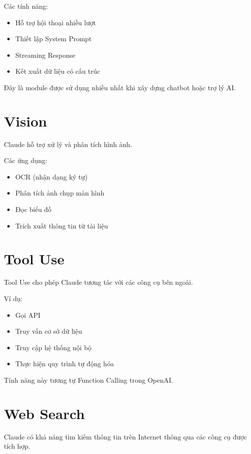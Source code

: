 \documentclass[12pt]{article}
\begin{document}
Các tính năng:

\begin{itemize}
    \item Hỗ trợ hội thoại nhiều lượt
    \item Thiết lập System Prompt
    \item Streaming Response
    \item Kết xuất dữ liệu có cấu trúc
\end{itemize}

Đây là module được sử dụng nhiều nhất khi xây dựng chatbot hoặc trợ lý AI.

\section{Vision}

Claude hỗ trợ xử lý và phân tích hình ảnh.

Các ứng dụng:

\begin{itemize}
    \item OCR (nhận dạng ký tự)
    \item Phân tích ảnh chụp màn hình
    \item Đọc biểu đồ
    \item Trích xuất thông tin từ tài liệu
\end{itemize}

\section{Tool Use}

Tool Use cho phép Claude tương tác với các công cụ bên ngoài.

Ví dụ:

\begin{itemize}
    \item Gọi API
    \item Truy vấn cơ sở dữ liệu
    \item Truy cập hệ thống nội bộ
    \item Thực hiện quy trình tự động hóa
\end{itemize}

Tính năng này tương tự Function Calling trong OpenAI.

\section{Web Search}

Claude có khả năng tìm kiếm thông tin trên Internet thông qua các công cụ được tích hợp.
\end{document}
